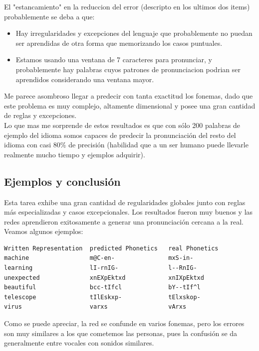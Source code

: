 \documentclass[paper=a4, fontsize=11pt]{scrartcl} %
\numberwithin{equation}{section} %
\numberwithin{figure}{section} %
\numberwithin{table}{section} %
\begin{document}
El "estancamiento" en la reduccion del error (descripto en los ultimos dos items) probablemente se deba a que:

\begin{itemize}
\item Hay irregularidades y excepciones del lenguaje que probablemente no puedan ser aprendidas de otra forma que memorizando los casos puntuales.
\item Estamos usando una ventana de 7 caracteres para pronunciar, y probablemente hay palabras cuyos patrones de pronunciacion podrian ser aprendidos considerando una ventana mayor.
\end{itemize}


Me parece asombroso llegar a predecir con tanta exactitud los fonemas, dado que este problema es muy complejo, altamente dimensional y posee una gran cantidad de reglas y excepciones. \\

Lo que mas me sorprende de estos resultados es que con sólo 200 palabras de ejemplo del idioma somos capaces de predecir la pronunciación del resto del idioma con casi 80\% de precisión (habilidad que a un ser humano puede llevarle realmente mucho tiempo y ejemplos adquirir). \\


\subsection{Ejemplos y conclusión}

Esta tarea exhibe una gran cantidad de regularidades globales junto con reglas más especializadas y casos excepcionales. Los resultados fueron muy buenos y las redes aprendieron exitosamente a generar una pronunciación cercana a la real. Veamos algunos ejemplos:

\begin{center}
\begin{BVerbatim}
Written Representation  predicted Phonetics   real Phonetics  
machine                 m@C-en-               mxS-in-  
learning                lI-rnIG-              l--RnIG- 
unexpected              xnEXpEktxd            xnIXpEktxd  
beautiful               bcc-tIfcl             bY--tIf^l 
telescope               tIlEskxp-             tElxskop- 
virus                   varxs                 vArxs

\end{BVerbatim}
\end{center}


Como se puede apreciar, la red se confunde en varios fonemas, pero los errores son muy similares a los que cometemos las personas, pues la confusión se da generalmente entre vocales con sonidos similares. \\
\end{document}
